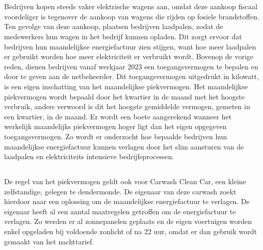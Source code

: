
\chapter{}%
\label{ch:inleiding}

\section{}%
\label{sec:context}

Bedrijven kopen steeds vaker elektrische wagens aan, omdat deze aankoop fiscaal voordeliger is tegenover de aankoop van wagens die rijden op fosiele brandstoffen. Ten gevolge van deze aankoop, plaatsen bedrijven laadpalen, zodat de medewerkers hun wagen in het bedrijf kunnen opladen. Dit zorgt ervoor dat bedrijven hun maandelijkse energiefactuur zien stijgen, want hoe meer laadpalen er gebruikt worden hoe meer elektriciteit er verbruikt wordt. Bovenop de vorige reden, dienen bedrijven vanaf werkjaar 2023 een toegangsvermogen te bepalen en door te geven aan de netbeheerder. Dit toegangsvermogen uitgedrukt in kilowatt, is een eigen inschatting van het maandelijkse piekvermogen. Het maandelijkse piekvermogen wordt bepaald door het kwartier in de maand met het hoogste verbruik, anders verwoord is dit het hoogste gemiddelde vermogen, gemeten in een kwartier, in de maand. Er wordt een boete aangerekend wanneer het werkelijk maandelijks piekvermogen hoger ligt dan het eigen opgegeven toegangsvermogen. Zo wordt er onderzocht hoe bepaalde bedrijven hun maandelijkse energiefactuur kunnen verlagen door het slim aansturen van de laadpalen en elektriciteits intensieve bedrijfsprocessen.

\section{}%
\label{sec:afbakening}

De regel van het piekvermogen geldt ook voor Carwash Clean Car, een kleine zelfstandige, gelegen te dendermonde. De eigenaar van deze carwash zoekt hierdoor naar een oplossing om de maandelijkse energiefactuur te verlagen. De eigenaar heeft al een aantal maatregelen getroffen om de energiefactuur te verlagen. Zo werden er al zonnepanelen geplaats en de eigen voertuigen worden enkel opgeladen bij voldoende zonlicht of na 22 uur, omdat er dan gebruik wordt gemaakt van het nachttarief. 

